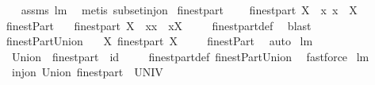 \begin{isabellebody}
%
\isadelimproof
\ \ %
\endisadelimproof
%
\isatagproof
{}\isamarkupfalse%
\ assms\ lm{}{}{}\ \isamarkupfalse%
\ {\isacharparenleft}metis\ subset{\isacharunderscore}inj{\isacharunderscore}on{\isacharparenright}%
\endisatagproof
{\isafoldproof}%
%
\isadelimproof
\isanewline
%
\endisadelimproof
\isanewline
\isanewline
{}\isamarkupfalse%
\ finestpart\ \isanewline
\ \ \ {\isachardoublequoteopen}finestpart\ X\ {\isacharequal}\ {\isacharparenleft}{\isacharpercent}x{\isachardot}\ {\isacharbraceleft}x{\isacharbraceright}{\isacharparenright}\ {\isacharbackquote}\ X{\isachardoublequoteclose}\isanewline
\isanewline
{}\isamarkupfalse%
\ finestPart{\isacharcolon}\ \isanewline
\ \ {\isachardoublequoteopen}finestpart\ X\ {\isacharequal}\ {\isacharbraceleft}{\isacharbraceleft}x{\isacharbraceright}{\isacharbar}x\ {\isachardot}\ x{\isasymin}X{\isacharbraceright}{\isachardoublequoteclose}\ \isanewline
%
\isadelimproof
\ \ %
\endisadelimproof
%
\isatagproof
{}\isamarkupfalse%
\ finestpart{\isacharunderscore}def\ \isamarkupfalse%
\ blast%
\endisatagproof
{\isafoldproof}%
%
\isadelimproof
\isanewline
%
\endisadelimproof
\isanewline
{}\isamarkupfalse%
\ finestPartUnion{\isacharcolon}\ \isanewline
\ \ {\isachardoublequoteopen}X{\isacharequal}{\isasymUnion}\ {\isacharparenleft}finestpart\ X{\isacharparenright}{\isachardoublequoteclose}\ \isanewline
%
\isadelimproof
\ \ %
\endisadelimproof
%
\isatagproof
{}\isamarkupfalse%
\ finestPart\ \isamarkupfalse%
\ auto%
\endisatagproof
{\isafoldproof}%
%
\isadelimproof
\isanewline
%
\endisadelimproof
\isanewline
{}\isamarkupfalse%
\ lm{}{}{}{\isacharcolon}\ \isanewline
\ \ {\isachardoublequoteopen}Union\ {\isasymcirc}\ finestpart\ {\isacharequal}\ id{\isachardoublequoteclose}\ \isanewline
%
\isadelimproof
\ \ %
\endisadelimproof
%
\isatagproof
{}\isamarkupfalse%
\ finestpart{\isacharunderscore}def\ finestPartUnion\ \isamarkupfalse%
\ fastforce%
\endisatagproof
{\isafoldproof}%
%
\isadelimproof
\isanewline
%
\endisadelimproof
\isanewline
{}\isamarkupfalse%
\ lm{}{}{}{\isacharcolon}\ \isanewline
\ \ {\isachardoublequoteopen}inj{\isacharunderscore}on\ Union\ {\isacharparenleft}finestpart\ {\isacharbackquote}\ UNIV{\isacharparenright}{\isachardoublequoteclose}\ \isanewline
%
\isadelimproof
\ \ %
\endisadelimproof

\end{isabellebody}
